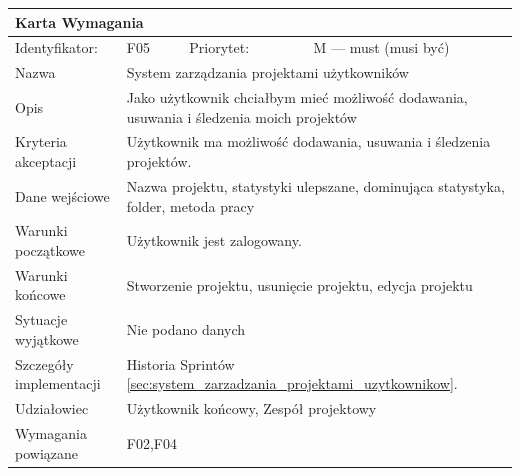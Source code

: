 \documentclass[a4paper,11pt]{report}
\begin{document}
		\begin{tabular}{|p{3cm}|p{2cm}|p{2cm}|p{6cm}|}
		\hline
		\multicolumn{4}{|p{12 cm}|}{Karta Wymagania}\\
		\hline
		Identyfikator: & F05 & Priorytet: & M — must (musi być)\\
		\hline
		Nazwa & \multicolumn{3}{|p{10 cm}|}{System zarządzania projektami użytkowników}\\
		\hline
		Opis & \multicolumn{3}{|p{10 cm}|}{Jako użytkownik chciałbym mieć możliwość dodawania, usuwania i śledzenia moich projektów}\\
		\hline
		Kryteria akceptacji & \multicolumn{3}{|p{10 cm}|}{Użytkownik ma możliwość dodawania, usuwania i śledzenia projektów.}\\
		\hline
		Dane wejściowe & \multicolumn{3}{|p{10 cm}|}{Nazwa projektu, statystyki ulepszane, dominująca statystyka, folder, metoda pracy}\\
		\hline
		Warunki początkowe & \multicolumn{3}{|p{10 cm}|}{Użytkownik jest zalogowany.}\\
		\hline
		Warunki końcowe & \multicolumn{3}{|p{10 cm}|}{Stworzenie projektu, usunięcie projektu, edycja projektu}\\
		\hline
		Sytuacje wyjątkowe & \multicolumn{3}{|p{10 cm}|}{Nie podano danych}\\
		\hline
		Szczegóły implementacji & \multicolumn{3}{|p{10 cm}|}{Historia Sprintów \ref{sec:system_zarzadzania_projektami_uzytkownikow}.}\\
		\hline
		Udziałowiec & \multicolumn{3}{|p{10 cm}|}{Użytkownik końcowy, Zespół projektowy}\\
		\hline
		Wymagania powiązane & \multicolumn{3}{|p{10 cm}|}{F02,F04}\\
		\hline
		\end{tabular}
		\newline
		\vspace*{0,2 cm}
		\newline
\end{document}
